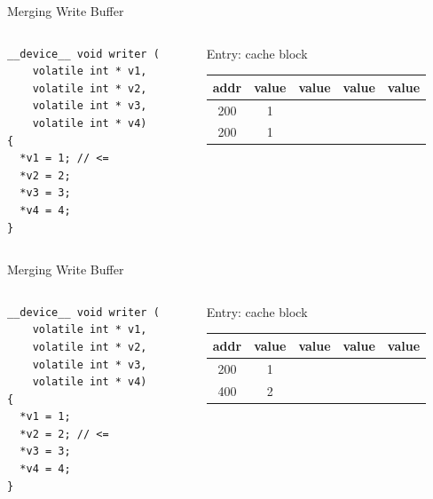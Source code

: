 \documentclass[aspectratio=169,compress]{beamer}
\begin{document}
\begin{frame}[fragile]{Merging Write Buffer}{}
\centering
\begin{columns}[T]
	\begin{column}{0.4\textwidth}
\begin{lstlisting}[]
__device__ void writer (
    volatile int * v1,
    volatile int * v2,
    volatile int * v3,
    volatile int * v4)
{          
  *v1 = 1; // <= 
  *v2 = 2;
  *v3 = 3;
  *v4 = 4;
}
\end{lstlisting}
\end{column}
\begin{column}{0.5\textwidth}
	\centering
	Entry: cache block
	\begin{table}
		\begin{tabular}{| c | c | c | c | c |}
			\hline 
			addr & value & value & value & value  \\
			\hline 
			200 & 1 & & & \\
			\hline 
			\textcolor{NordBlack}{200} & \textcolor{NordBlack}{1} & & & \\
			\hline 
		\end{tabular}
	\end{table}
\end{column}
\end{columns}
\end{frame}


\begin{frame}[fragile]{Merging Write Buffer}{}
\centering
\begin{columns}[T]
	\begin{column}{0.4\textwidth}
\begin{lstlisting}[]
__device__ void writer (
    volatile int * v1,
    volatile int * v2,
    volatile int * v3,
    volatile int * v4)
{          
  *v1 = 1;
  *v2 = 2; // <= 
  *v3 = 3;
  *v4 = 4;
}
\end{lstlisting}
\end{column}
\begin{column}{0.5\textwidth}
	\centering
	Entry: cache block
	\begin{table}
		\begin{tabular}{| c | c | c | c | c |}
			\hline 
			addr & value & value & value & value  \\
			\hline 
			200 & 1 & & & \\
			\hline 
			400 & 2 & & & \\
			\hline 
		\end{tabular}
	\end{table}
\end{column}
\end{columns}
\end{frame}
\end{document}
